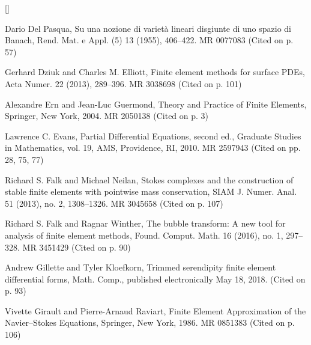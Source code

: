 \begin{list}{[]}{\setlength{\leftmargin}{2.7em}\setlength{\labelwidth}{2.2em}}
\item\label{bib:source-38}Dario Del Pasqua, Su una nozione di varietà lineari disgiunte di uno spazio di Banach, Rend. Mat. e Appl. (5) 13 (1955), 406–422. MR 0077083 (Cited on p. 57)

\item\label{bib:source-39}Gerhard Dziuk and Charles M. Elliott, Finite element methods for surface PDEs, Acta Numer. 22 (2013), 289–396. MR 3038698 (Cited on p. 101)

\item\label{bib:source-40}Alexandre Ern and Jean-Luc Guermond, Theory and Practice of Finite Elements, Springer, New York, 2004. MR 2050138 (Cited on p. 3)

\item\label{bib:source-41}Lawrence C. Evans, Partial Differential Equations, second ed., Graduate Studies in Mathematics, vol. 19, AMS, Providence, RI, 2010. MR 2597943 (Cited on pp. 28, 75, 77)

\item\label{bib:source-42}Richard S. Falk and Michael Neilan, Stokes complexes and the construction of stable finite elements with pointwise mass conservation, SIAM J. Numer. Anal. 51 (2013), no. 2, 1308–1326. MR 3045658 (Cited on p. 107)

\item\label{bib:source-43}Richard S. Falk and Ragnar Winther, The bubble transform: A new tool for analysis of finite element methods, Found. Comput. Math. 16 (2016), no. 1, 297–328. MR 3451429 (Cited on p. 90)

\item\label{bib:source-44}Andrew Gillette and Tyler Kloefkorn, Trimmed serendipity finite element differential forms, Math. Comp., published electronically May 18, 2018. (Cited on p. 93)

\item\label{bib:source-45}Vivette Girault and Pierre-Arnaud Raviart, Finite Element Approximation of the Navier–Stokes Equations, Springer, New York, 1986. MR 0851383 (Cited on p. 106)


\end{list}
